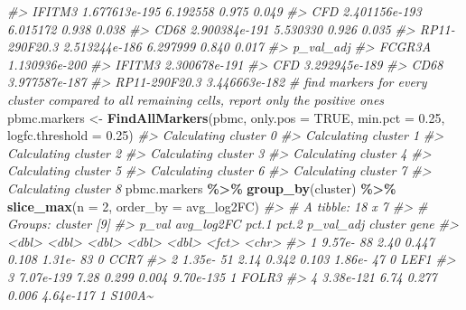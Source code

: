 \documentclass[
]{book}
\newenvironment{Shaded}{\begin{snugshade}}{\end{snugshade}}
\newcommand{\AttributeTok}[1]{\textcolor[rgb]{0.13,0.29,0.53}{#1}}
\newcommand{\CommentTok}[1]{\textcolor[rgb]{0.56,0.35,0.01}{\textit{#1}}}
\newcommand{\ConstantTok}[1]{\textcolor[rgb]{0.56,0.35,0.01}{#1}}
\newcommand{\DecValTok}[1]{\textcolor[rgb]{0.00,0.00,0.81}{#1}}
\newcommand{\FloatTok}[1]{\textcolor[rgb]{0.00,0.00,0.81}{#1}}
\newcommand{\FunctionTok}[1]{\textcolor[rgb]{0.13,0.29,0.53}{\textbf{#1}}}
\newcommand{\NormalTok}[1]{#1}
\newcommand{\OtherTok}[1]{\textcolor[rgb]{0.56,0.35,0.01}{#1}}
\newcommand{\SpecialCharTok}[1]{\textcolor[rgb]{0.81,0.36,0.00}{\textbf{#1}}}
\begin{document}
\begin{Shaded}
\begin{Highlighting}[]
\CommentTok{\#\textgreater{} IFITM3        1.677613e{-}195   6.192558 0.975 0.049}
\CommentTok{\#\textgreater{} CFD           2.401156e{-}193   6.015172 0.938 0.038}
\CommentTok{\#\textgreater{} CD68          2.900384e{-}191   5.530330 0.926 0.035}
\CommentTok{\#\textgreater{} RP11{-}290F20.3 2.513244e{-}186   6.297999 0.840 0.017}
\CommentTok{\#\textgreater{}                   p\_val\_adj}
\CommentTok{\#\textgreater{} FCGR3A        1.130936e{-}200}
\CommentTok{\#\textgreater{} IFITM3        2.300678e{-}191}
\CommentTok{\#\textgreater{} CFD           3.292945e{-}189}
\CommentTok{\#\textgreater{} CD68          3.977587e{-}187}
\CommentTok{\#\textgreater{} RP11{-}290F20.3 3.446663e{-}182}
\CommentTok{\# find markers for every cluster compared to all remaining cells, report only the positive ones}
\NormalTok{pbmc.markers }\OtherTok{\textless{}{-}} \FunctionTok{FindAllMarkers}\NormalTok{(pbmc, }\AttributeTok{only.pos =} \ConstantTok{TRUE}\NormalTok{, }\AttributeTok{min.pct =} \FloatTok{0.25}\NormalTok{, }\AttributeTok{logfc.threshold =} \FloatTok{0.25}\NormalTok{)}
\CommentTok{\#\textgreater{} Calculating cluster 0}
\CommentTok{\#\textgreater{} Calculating cluster 1}
\CommentTok{\#\textgreater{} Calculating cluster 2}
\CommentTok{\#\textgreater{} Calculating cluster 3}
\CommentTok{\#\textgreater{} Calculating cluster 4}
\CommentTok{\#\textgreater{} Calculating cluster 5}
\CommentTok{\#\textgreater{} Calculating cluster 6}
\CommentTok{\#\textgreater{} Calculating cluster 7}
\CommentTok{\#\textgreater{} Calculating cluster 8}
\NormalTok{pbmc.markers }\SpecialCharTok{\%\textgreater{}\%} \FunctionTok{group\_by}\NormalTok{(cluster) }\SpecialCharTok{\%\textgreater{}\%} \FunctionTok{slice\_max}\NormalTok{(}\AttributeTok{n =} \DecValTok{2}\NormalTok{, }\AttributeTok{order\_by =}\NormalTok{ avg\_log2FC)}
\CommentTok{\#\textgreater{} \# A tibble: 18 x 7}
\CommentTok{\#\textgreater{} \# Groups:   cluster [9]}
\CommentTok{\#\textgreater{}        p\_val avg\_log2FC pct.1 pct.2 p\_val\_adj cluster gene  }
\CommentTok{\#\textgreater{}        \textless{}dbl\textgreater{}      \textless{}dbl\textgreater{} \textless{}dbl\textgreater{} \textless{}dbl\textgreater{}     \textless{}dbl\textgreater{} \textless{}fct\textgreater{}   \textless{}chr\textgreater{} }
\CommentTok{\#\textgreater{}  1 9.57e{-} 88       2.40 0.447 0.108 1.31e{-} 83 0       CCR7  }
\CommentTok{\#\textgreater{}  2 1.35e{-} 51       2.14 0.342 0.103 1.86e{-} 47 0       LEF1  }
\CommentTok{\#\textgreater{}  3 7.07e{-}139       7.28 0.299 0.004 9.70e{-}135 1       FOLR3 }
\CommentTok{\#\textgreater{}  4 3.38e{-}121       6.74 0.277 0.006 4.64e{-}117 1       S100A\textasciitilde{}}

\end{Highlighting}
\end{Shaded}
\end{document}
